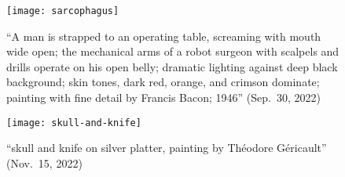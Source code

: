 \begin{figure}[t]
\begin{minipage}[t]{0.49\textwidth}
    \centering
    \texttt{[image: sarcophagus]}
    \caption{``A man is strapped to an operating table, screaming with mouth
        wide open; the mechanical arms of a robot surgeon with scalpels and
        drills operate on his open belly; dramatic lighting against deep black
        background; skin tones, dark red, orange, and crimson dominate; painting
        with fine detail by Francis Bacon; 1946'' (Sep.\ 30, 2022)}
\end{minipage}
\hfill
\begin{minipage}[t]{0.49\textwidth}
    \centering
    \texttt{[image: skull-and-knife]}
    \caption{``skull and knife on silver platter, painting by Théodore
        Géricault'' (Nov.\ 15, 2022)}
    \label{fig:dalle:gen10}
\end{minipage}
\end{figure}
